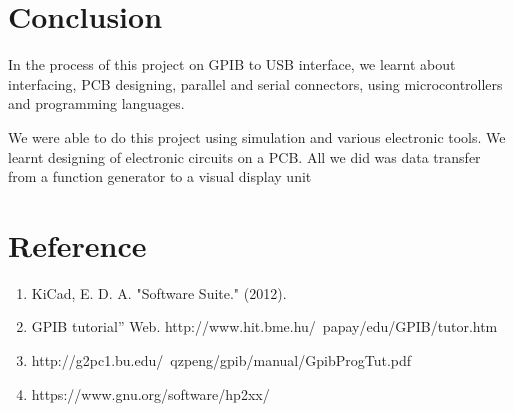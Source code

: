 \documentclass[12pt]{article}
\begin{document}
\section{Conclusion}
In the process of this project on GPIB to USB interface, we learnt about interfacing, PCB designing, parallel and serial connectors, using microcontrollers and programming languages.\par 
We were able to do this project using simulation and various electronic tools. We learnt designing of electronic circuits on a PCB. All we did was data transfer from a function generator to a visual display unit

\section{Reference}
 \begin{enumerate}
\item KiCad, E. D. A. "Software Suite." (2012).
\item GPIB tutorial” Web. http://www.hit.bme.hu/~papay/edu/GPIB/tutor.htm
\item http://g2pc1.bu.edu/~qzpeng/gpib/manual/GpibProgTut.pdf
\item https://www.gnu.org/software/hp2xx/
\end{enumerate}
\end{document}
